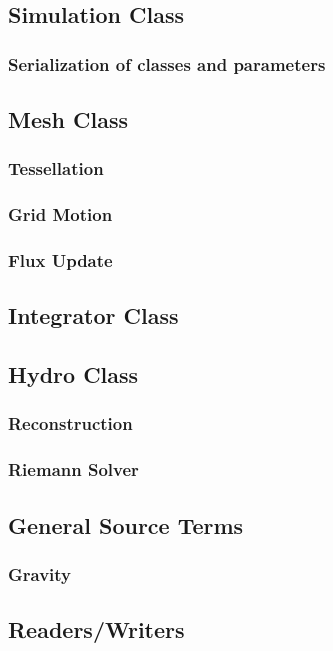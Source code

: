 \subsection{Simulation Class}
\subsubsection{Serialization of classes and parameters}

\subsection{Mesh Class}
\subsubsection{Tessellation}
\subsubsection{Grid Motion}
\subsubsection{Flux Update}

\subsection{Integrator Class}

\subsection{Hydro Class}
\subsubsection{Reconstruction}
\subsubsection{Riemann Solver}

\subsection{General Source Terms}
\subsubsection{Gravity}

\subsection{Readers/Writers}
